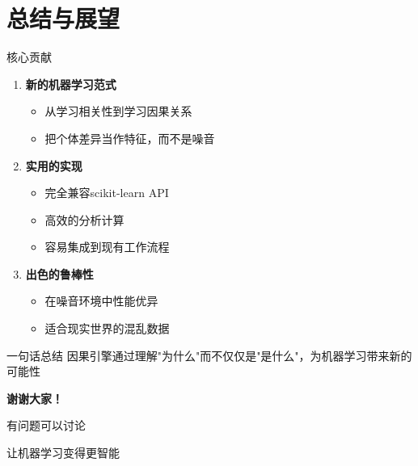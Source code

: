 \documentclass[aspectratio=169,12pt]{beamer}
\begin{document}
\section{总结与展望}

\begin{frame}{核心贡献}
\begin{enumerate}
    \item \textbf{新的机器学习范式}
    \begin{itemize}
        \item 从学习相关性到学习因果关系
        \item 把个体差异当作特征，而不是噪音
    \end{itemize}
    
    \item \textbf{实用的实现}
    \begin{itemize}
        \item 完全兼容scikit-learn API
        \item 高效的分析计算
        \item 容易集成到现有工作流程
    \end{itemize}
    
    \item \textbf{出色的鲁棒性}
    \begin{itemize}
        \item 在噪音环境中性能优异
        \item 适合现实世界的混乱数据
    \end{itemize}
\end{enumerate}

\vspace{1em}
\begin{block}{一句话总结}
因果引擎通过理解"为什么"而不仅仅是"是什么"，为机器学习带来新的可能性
\end{block}
\end{frame}

\begin{frame}
\begin{center}
{\Huge \textbf{谢谢大家！}}

\vspace{2em}

{\Large 有问题可以讨论}

\vspace{2em}

{\large 让机器学习变得更智能 🚀}
\end{center}
\end{frame}
\end{document}
